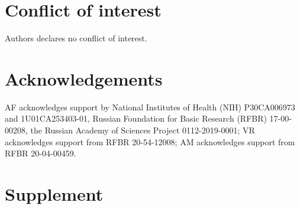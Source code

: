 \documentclass{llncs}
\begin{document}
\section{Conflict of interest}
Authors declares no conflict of interest.

\section{Acknowledgements}
AF acknowledges support by National Institutes of Health (NIH) P30CA006973 and 1U01CA253403-01, Russian Foundation for Basic Research (RFBR) 17-00-00208, the Russian Academy of Sciences Project 0112-2019-0001; VR acknowledges support from RFBR 20-54-12008; AM acknowledges support from RFBR 20-04-00459.





\newcommand{\beginsupplement}{%
        \setcounter{table}{0}
        \renewcommand{\thetable}{S\arabic{table}}%
        \setcounter{figure}{0}
        \renewcommand{\thefigure}{S\arabic{figure}}
        \setcounter{equation}{0}
        \renewcommand{\theequation}{S\arabic{equation}}%
     }
\section*{Supplement}
\beginsupplement
\end{document}

